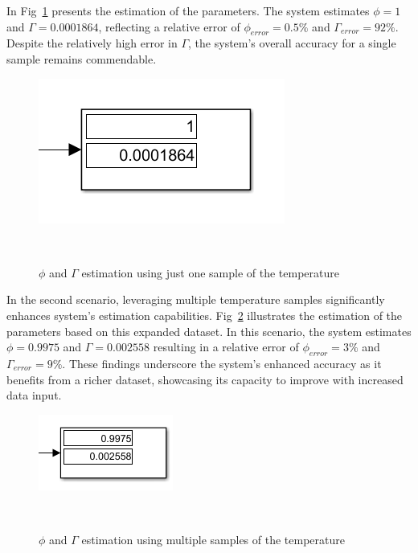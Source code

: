 In Fig~\ref{fig:simulink_params} presents the estimation of the parameters. The system estimates $\phi = 1$ and $\Gamma = 0.0001864$, reflecting a relative error of $\phi_{error} = 0.5\%$ and $\Gamma_{error} = 92\%$. Despite the relatively high error in $\Gamma$, the system's overall accuracy for a single sample remains commendable.

\begin{figure}[H]
\centering
\includegraphics[width=0.55\linewidth]{figures/simulink_params.png}
\caption{$\phi$ and $\Gamma$ estimation using just one sample of the temperature}
~\label{fig:simulink_params}
\end{figure}

In the second scenario, leveraging multiple temperature samples significantly enhances system's estimation capabilities. Fig~\ref{fig:simulink_params_gen} illustrates the estimation of the parameters based on this expanded dataset. In this scenario, the system estimates $\phi = 0.9975$ and $\Gamma = 0.002558$ resulting in a relative error of $\phi_{error} = 3\%$ and $\Gamma_{error} = 9\%$. These findings underscore the system's enhanced accuracy as it benefits from a richer dataset, showcasing its capacity to improve with increased data input.

\begin{figure}[H]
\centering
\includegraphics[width=0.4\linewidth]{figures/simulink_params_gen.png}
\caption{$\phi$ and $\Gamma$ estimation using multiple samples of the temperature}
~\label{fig:simulink_params_gen}
\end{figure}
